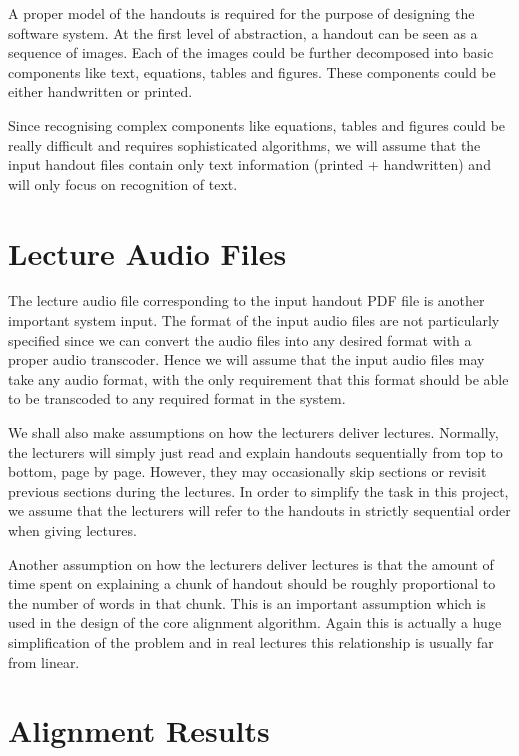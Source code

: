 A proper model of the handouts is required for the purpose of designing the software system. At the first level of abstraction, a handout can be seen as a sequence of images. Each of the images could be further decomposed into basic components like text, equations, tables and figures. These components could be either handwritten or printed.

Since recognising complex components like equations, tables and figures could be really difficult and requires sophisticated algorithms, we will assume that the input handout files contain only text information (printed + handwritten) and will only focus on recognition of text.


\section{Lecture Audio Files}

The lecture audio file corresponding to the input handout PDF file is another important system input. The format of the input audio files are not particularly specified since we can convert the audio files into any desired format with a proper audio transcoder. Hence we will assume that the input audio files may take any audio format, with the only requirement that this format should be able to be transcoded to any required format in the system.

We shall also make assumptions on how the lecturers deliver lectures. Normally, the lecturers will simply just read and explain handouts sequentially from top to bottom, page by page. However, they may occasionally skip sections or revisit previous sections during the lectures. In order to simplify the task in this project, we assume that the lecturers will refer to the handouts in strictly sequential order when giving lectures.

Another assumption on how the lecturers deliver lectures is that the amount of time spent on explaining a chunk of handout should be roughly proportional to the number of words in that chunk. This is an important assumption which is used in the design of the core alignment algorithm. Again this is actually a huge simplification of the problem and in real lectures this relationship is usually far from linear. 


\section{Alignment Results}
\label{sec:assume-align-res}

